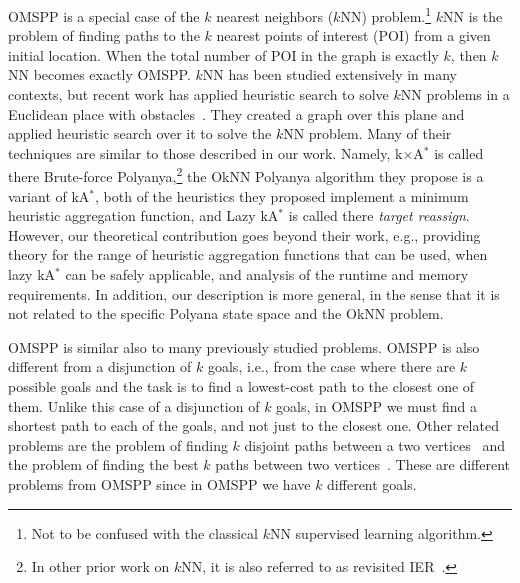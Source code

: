 \documentclass[smallextended]{svjour3}       %
\newcommand{\omspp}{\ac{OMSPP}\xspace}
\newcommand{\kastar}{kA$^*$\xspace}
\newcommand{\kxastar}{k$\times$A$^*$\xspace}
\begin{document}
\omspp is a special case of the $k$ nearest neighbors ($k$NN) problem.\footnote{Not to be confused with the classical $k$NN supervised learning algorithm.} $k$NN is the problem of finding paths to the $k$ nearest points of interest (POI) from a given initial location.  
When the total number of POI in the graph is exactly $k$, then $k$NN becomes exactly \omspp. 
$k$NN has been studied extensively in many contexts, but recent work has applied heuristic search to solve $k$NN problems in  a Euclidean place with obstacles~\cite{zhao2018fast}. They created a graph over this plane and applied heuristic search over it to solve the $k$NN problem. Many of their techniques are similar to those described in our work. Namely, \kxastar is called there Brute-force Polyanya,\footnote{In other prior work on $k$NN, it is also referred to as revisited IER~\cite{abeywickrama2016k}.} the OkNN Polyanya algorithm they propose is a variant of \kastar, both of the heuristics they proposed implement a minimum heuristic aggregation function, and Lazy \kastar is called there \emph{target reassign}. 
However, our theoretical contribution goes beyond their work, e.g., providing theory for the range of heuristic aggregation functions that can be used, when lazy \kastar can be safely applicable, and analysis of the runtime and memory requirements. In addition, our description is more general, in the sense that it is not related to the specific Polyana state space and the OkNN problem. 


\omspp is similar also to many previously studied problems. 
\omspp is also different from a disjunction of $k$ goals, i.e., from the case where there are $k$ possible goals and the task is to find a lowest-cost path to the closest one of them. 
Unlike this case of a disjunction of $k$ goals, in \omspp we must find a shortest path to each of the goals, and not just to the closest one.
Other related problems are the problem of finding $k$ disjoint paths between a two vertices~\cite{suurballe.jw:disjoint} and the problem of finding the best $k$ paths between two vertices~\cite{pollack.m:letter,Eppstein1998}.
These are different problems from \omspp since in \omspp we have $k$ different goals.
\end{document}

